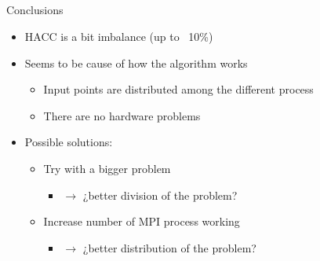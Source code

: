\documentclass[aspectratio=169]{bredelebeamer}
\begin{document}
\subsection{}

\begin{frame}{Conclusions}
\begin{itemize}
\item HACC is a bit imbalance (up to ~10\%)
\item Seems to be cause of how the algorithm works
	\begin{itemize}
		\item Input points are distributed among the different process\\
		\item There are no hardware problems\\
	\end{itemize}
\end{itemize}	

\hspace{1cm}

\begin{itemize}
\item Possible solutions:
\begin{itemize}
	\item Try with a bigger problem 
	\begin{itemize}
		\item[] $\rightarrow$ ¿better division of the problem?
	\end{itemize}
	
	
	\item Increase number of MPI process working
	\begin{itemize}
		\item[] $\rightarrow$ ¿better distribution of the problem?
	\end{itemize} 
	

\end{itemize}
\end{itemize}
\end{frame}
\end{document}
